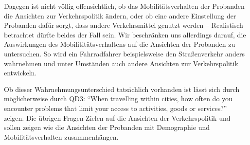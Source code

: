Dagegen ist nicht völlig offensichtlich, ob das Mobilitätsverhalten der Probanden die Ansichten zur Verkehrspolitik ändern, oder ob eine andere Einstellung der Probanden dafür sorgt, dass andere Verkehrsmittel genutzt werden – Realistisch betrachtet dürfte beides der Fall sein.
Wir beschränken uns allerdings darauf, die Auswirkungen des Mobilititätsverhaltens auf die Ansichten der Probanden zu untersuchen.
So wird ein Fahrradfahrer beispielsweise den Straßenverkehr anders wahrnehmen und unter Umständen auch andere Ansichten zur Verkehrspolitik entwickeln.

Ob dieser Wahrnehmungsunterschied tatsächlich vorhanden ist lässt sich durch möglicherweise durch QD3: \enquote{When travelling within cities, how often do you encounter problems that limit your access to activities, goods or services?} zeigen.
Die übrigen Fragen Zielen auf die Ansichten der Verkehrspolitik und sollen zeigen wie die Ansichten der Probanden mit Demographie und Mobilitätsverhalten zusammenhängen.
\\

\nocite{schulz}


